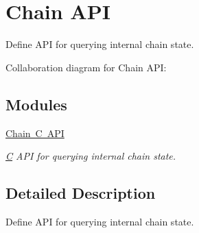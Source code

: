 \hypertarget{group__chainapi}{}\section{Chain A\+PI}
\label{group__chainapi}


Define A\+PI for querying internal chain state.  


Collaboration diagram for Chain A\+PI\+:
\subsection*{Modules}
\begin{DoxyCompactItemize}
\item 
\mbox{\hyperlink{group__chaincapi}{Chain C A\+PI}}
\begin{DoxyCompactList}\small\item\em \mbox{\hyperlink{struct_c}{C}} A\+PI for querying internal chain state. \end{DoxyCompactList}\end{DoxyCompactItemize}


\subsection{Detailed Description}
Define A\+PI for querying internal chain state. 

